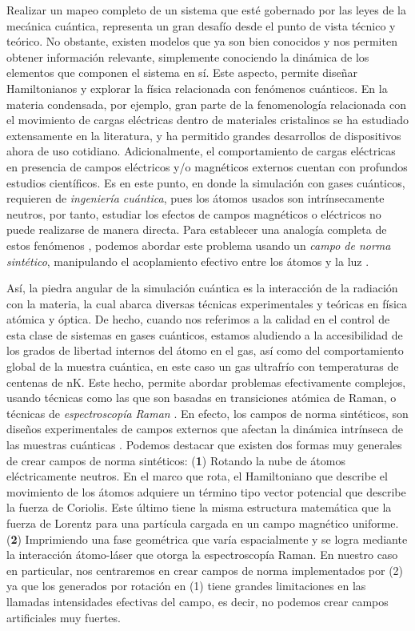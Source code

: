 \documentclass[superscriptaddress,onecolumn,aps,preprint,showpacs,nofootinbib,pra,11pt]{revtex4-2}
\begin{document}
\begin{normalsize}
Realizar un mapeo completo de un sistema que esté gobernado por las leyes de la mecánica cuántica, representa un gran desafío desde el punto de vista técnico y teórico. No obstante, existen modelos que ya son bien conocidos y nos permiten obtener información relevante, simplemente conociendo la dinámica de los elementos que componen el sistema en sí. Este aspecto, permite diseñar Hamiltonianos y explorar la física relacionada con fenómenos cuánticos.  En la materia condensada, por ejemplo, gran parte de la fenomenología relacionada con el movimiento de cargas eléctricas dentro de materiales cristalinos se ha estudiado extensamente en la literatura, y ha permitido grandes desarrollos de dispositivos ahora de uso cotidiano. Adicionalmente, el comportamiento de cargas eléctricas en presencia de campos eléctricos y/o magnéticos externos cuentan con profundos estudios científicos. Es en este punto, en donde la simulación con gases cuánticos, requieren de \textit{ingeniería cuántica}, pues los átomos usados son intrínsecamente neutros, por tanto, estudiar los efectos de campos magnéticos o eléctricos no puede realizarse de manera directa. Para establecer una analogía completa de estos fenómenos \cite{Galitski-phystoday72}, podemos abordar este problema usando un \textit{campo de norma sintético}, manipulando el acoplamiento efectivo entre los átomos y la luz \cite{Galitski-nature494}.\medskip

Así, la piedra angular de la simulación cuántica es la interacción de la radiación con la materia, la cual abarca diversas técnicas experimentales y teóricas en física atómica y óptica. De hecho, cuando nos referimos a la calidad en el control de esta clase de sistemas en gases cuánticos, estamos aludiendo a la accesibilidad de los grados de libertad internos del átomo en el gas, así como del comportamiento global de la muestra cuántica, en este caso un gas ultrafrío con temperaturas de centenas de $\mathrm{nK}$. Este hecho, permite abordar problemas efectivamente complejos, usando técnicas como las que son basadas en transiciones atómica de Raman, o técnicas de \textit{espectroscopía Raman} \cite{Jaksch-newjphys5}. En efecto, los campos de norma sintéticos, son diseños experimentales de campos externos que afectan la dinámica intrínseca de las muestras cuánticas \cite{Galitski-nature494}. Podemos destacar que existen dos formas muy generales de crear campos de norma sintéticos: (\textbf{1}) Rotando la nube de \'atomos el\'ectricamente neutros. En el marco que rota, el Hamiltoniano que describe el movimiento de los \'atomos adquiere un t\'ermino tipo vector potencial que describe la fuerza de Coriolis. Este \'ultimo tiene la misma estructura matem\'atica que la fuerza de Lorentz para una part\'icula cargada en un campo magn\'etico uniforme. (\textbf{2}) Imprimiendo una fase geométrica que varía espacialmente y se logra mediante la interacción átomo-láser que otorga la espectroscopía Raman. En nuestro caso en particular, nos centraremos en crear campos de norma implementados por (2) ya que los generados por rotación en (1) tiene grandes limitaciones en las llamadas intensidades efectivas del campo, es decir, no podemos crear campos artificiales muy fuertes.\medskip


\end{normalsize}
\end{document}
